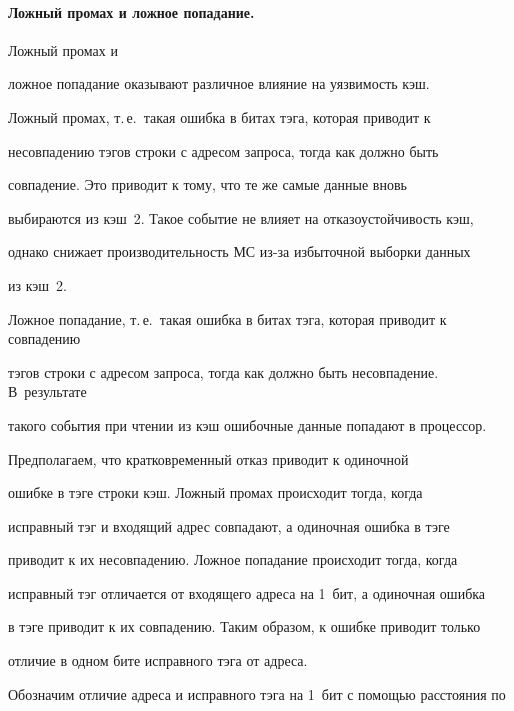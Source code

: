 \vspace*{-9pt}


      


      \paragraph{Ложный промах и ложное попадание.} Ложный промах и 


ложное попадание оказывают различное влияние на  уязвимость кэш.  


Ложный промах, т.\,е.\ такая ошибка в битах тэга, которая приводит к  


несовпадению тэгов строки с  адресом запроса, тогда как должно быть 


совпадение.  Это приводит к тому, что те же самые данные вновь 


выбираются из кэш~2. Такое событие не влияет на отказоустойчивость кэш, 


однако  снижает производительность МС из-за избыточной выборки данных 


из кэш~2.





Ложное попадание, т.\,е.\ такая ошибка в битах тэга, которая приводит к совпадению 


тэгов строки с  адресом запроса, тогда как должно быть несовпадение.  В~результате 


такого события  при чтении из кэш ошибочные данные попадают в процессор. 


      


      Предполагаем, что кратковременный отказ приводит к одиночной 


ошибке в тэге строки кэш.  Ложный промах происходит тогда, когда 


исправный тэг и входящий адрес совпадают, а одиночная ошибка  в тэге 


приводит к их несовпадению. Ложное попадание происходит тогда, когда 


исправный тэг отличается от входящего адреса на 1~бит, а одиночная ошибка  


в тэге приводит к их совпадению. Таким образом, к ошибке приводит только 


отличие  в одном бите исправного тэга от адреса. 





Обозначим отличие адреса и исправного тэга на 1~бит  с помощью расстояния по 


